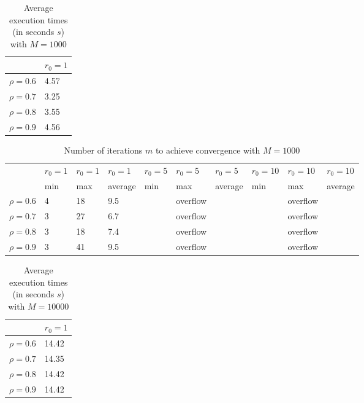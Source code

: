 \documentclass[a4paper,11pt,openright]{report}
\begin{document}
\begin{table}[H]
\centering
\addtolength{\leftskip}{-1.5cm}
\addtolength{\rightskip}{-1.5cm}
\begin{tabular}{|c|l|}
\hline
$ $ & $r_0 = 1$  \\
\hline
$\rho = 0.6$ & 4.57 \\

$\rho = 0.7$ & 3.25 \\

$\rho = 0.8$ & 3.55 \\

$\rho = 0.9$ & 4.56 \\
\hline
\end{tabular}
\caption{Average execution
 times (in seconds $s$) with $M = 1000$}
\end{table}
\begin{table}[H]
\centering
\addtolength{\leftskip}{-1.5cm}
\addtolength{\rightskip}{-1.5cm}
\begin{tabular}{|c|lllllllll|}
\hline
$ $ & $r_0 = 1$ & $r_0 = 1$ & $r_0 = 1$ & $r_0 = 5$ & $r_0 = 5$ & $r_0 = 5$ & $r_0 = 10$ & $r_0 = 10$ & $r_0 = 10$  \\
$ $ & min & max & average & min & max & average & min & max & average \\ 
\hline
$\rho = 0.6$ & 4 & 18 & 9.5 &  & overflow & &  & overflow &  \\

$\rho = 0.7$ & 3 & 27 & 6.7 &  & overflow & &  & overflow &  \\

$\rho = 0.8$ & 3 & 18 & 7.4 &  & overflow & &  & overflow &  \\

$\rho = 0.9$ & 3 & 41 & 9.5 &  & overflow & &  & overflow &  \\
\hline
\end{tabular}
\caption{Number of iterations $m$ to achieve convergence with $M = 1000$}
\end{table}
\begin{table}[H]
\centering
\addtolength{\leftskip}{-1.5cm}
\addtolength{\rightskip}{-1.5cm}
\begin{tabular}{|c|l|}
\hline
$ $ & $r_0 = 1$  \\
\hline
$\rho = 0.6$ & 14.42 \\

$\rho = 0.7$ & 14.35 \\

$\rho = 0.8$ & 14.42 \\

$\rho = 0.9$ & 14.42 \\
\hline
\end{tabular}
\caption{Average execution
 times (in seconds $s$) with $M = 10000$}
\end{table}
\end{document}
